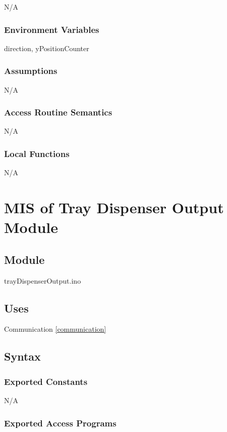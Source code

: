 \documentclass[12pt, titlepage]{article}
\begin{document}
N/A

\subsubsection{Environment Variables}

direction, yPositionCounter

\subsubsection{Assumptions}

N/A


\subsubsection{Access Routine Semantics}

N/A




\subsubsection{Local Functions}

N/A


  \section{MIS of Tray Dispenser Output Module} \label{trayDispenserOutput} 

\subsection{Module}

trayDispenserOutput.ino

\subsection{Uses}
Communication \ref{communication}

\subsection{Syntax}

\subsubsection{Exported Constants}
N/A
\subsubsection{Exported Access Programs}
\end{document}
